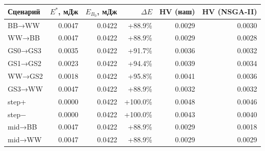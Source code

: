 \begin{tabular}{lrrrrr}
\hline
Сценарий & $E^*$, мДж & $E_{B_0}$, мДж & $\Delta E$ & HV (наш) & HV (NSGA-II) \\
\hline
BB→WW & 0.0047 & 0.0422 & +88.9\% & 0.0029 & 0.0030 \\
WW→BB & 0.0047 & 0.0422 & +88.9\% & 0.0029 & 0.0028 \\
GS0→GS3 & 0.0035 & 0.0422 & +91.7\% & 0.0036 & 0.0032 \\
GS1→GS2 & 0.0023 & 0.0422 & +94.4\% & 0.0039 & 0.0034 \\
WW→GS2 & 0.0018 & 0.0422 & +95.8\% & 0.0041 & 0.0036 \\
GS3→WW & 0.0047 & 0.0422 & +88.9\% & 0.0032 & 0.0032 \\
step+ & 0.0000 & 0.0422 & +100.0\% & 0.0048 & 0.0046 \\
step− & 0.0000 & 0.0422 & +100.0\% & 0.0043 & 0.0040 \\
mid→BB & 0.0047 & 0.0422 & +88.9\% & 0.0029 & 0.0018 \\
mid→WW & 0.0047 & 0.0422 & +88.9\% & 0.0029 & 0.0029 \\
\hline
\end{tabular}

